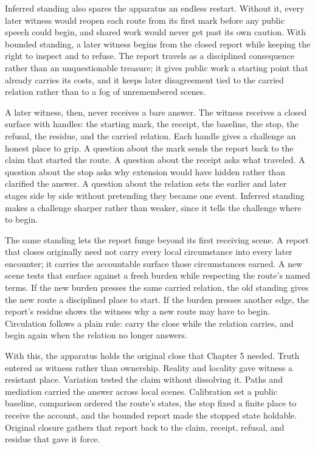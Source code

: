 Inferred standing also spares the apparatus an endless restart. Without it, every
later witness would reopen each route from its first mark before any public
speech could begin, and shared work would never get past its own caution. With
bounded standing, a later witness begins from the closed report while keeping the
right to inspect and to refuse. The report travels as a disciplined consequence
rather than an unquestionable treasure; it gives public work a starting point
that already carries its costs, and it keeps later disagreement tied to the
carried relation rather than to a fog of unremembered scenes.

A later witness, then, never receives a bare answer. The witness receives a
closed surface with handles: the starting mark, the receipt, the baseline, the
stop, the refusal, the residue, and the carried relation. Each handle gives a
challenge an honest place to grip. A question about the mark sends the report
back to the claim that started the route. A question about the receipt asks what
traveled. A question about the stop asks why extension would have hidden rather
than clarified the answer. A question about the relation sets the earlier and
later stages side by side without pretending they became one event. Inferred
standing makes a challenge sharper rather than weaker, since it tells the
challenge where to begin.

The same standing lets the report funge beyond its first receiving scene. A
report that closes originally need not carry every local circumstance into every
later encounter; it carries the accountable surface those circumstances earned.
A new scene tests that surface against a fresh burden while respecting the
route's named terms. If the new burden presses the same carried relation, the
old standing gives the new route a disciplined place to start. If the burden
presses another edge, the report's residue shows the witness why a new route may
have to begin. Circulation follows a plain rule: carry the close while the
relation carries, and begin again when the relation no longer answers.

With this, the apparatus holds the original close that Chapter 5 needed. Truth
entered as witness rather than ownership. Reality and locality gave witness a
resistant place. Variation tested the claim without dissolving it. Paths and
mediation carried the answer across local scenes. Calibration set a public
baseline, comparison ordered the route's states, the stop fixed a finite place
to receive the account, and the bounded report made the stopped state holdable.
Original closure gathers that report back to the claim, receipt, refusal, and
residue that gave it force.

